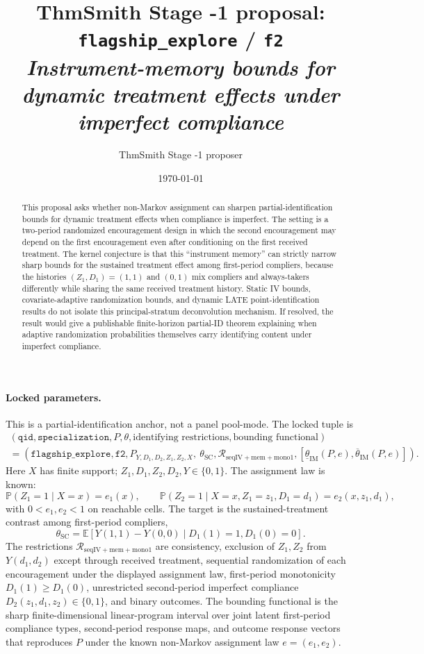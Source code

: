 \documentclass[11pt]{article}
\title{ThmSmith Stage -1 proposal: \texttt{flagship\_explore} / \texttt{f2}%
  \\ \large\textit{Instrument-memory bounds for dynamic treatment effects under imperfect compliance}}
\author{ThmSmith Stage -1 proposer}
\date{\today}
\newcommand{\E}{\mathbb{E}}
\renewcommand{\Pr}{\mathbb{P}}
\theoremstyle{definition}
\theoremstyle{plain}
\theoremstyle{remark}
\begin{document}
\maketitle


\paragraph{Locked parameters.}
This is a partial-identification anchor, not a panel pool-mode.  The locked tuple is
\[
\begin{gathered}
(\texttt{qid},\texttt{specialization},P,\theta,\text{identifying restrictions},
  \text{bounding functional})\\
=
(\texttt{flagship\_explore},\texttt{f2},
  P_{Y,D_1,D_2,Z_1,Z_2,X},\
  \theta_{\mathrm{SC}},
  \mathcal{R}_{\mathrm{seqIV+mem+mono1}},
  [\underline\theta_{\mathrm{IM}}(P,e),\overline\theta_{\mathrm{IM}}(P,e)]) .
\end{gathered}
\]
Here \(X\) has finite support; \(Z_1,D_1,Z_2,D_2,Y\in\{0,1\}\).  The assignment law is known:
\[
\Pr(Z_1=1\mid X=x)=e_1(x),\qquad
\Pr(Z_2=1\mid X=x,Z_1=z_1,D_1=d_1)=e_2(x,z_1,d_1),
\]
with \(0<e_1,e_2<1\) on reachable cells.  The target is the sustained-treatment contrast among first-period compliers,
\[
\theta_{\mathrm{SC}}=\E[Y(1,1)-Y(0,0)\mid D_1(1)=1,D_1(0)=0].
\]
The restrictions \(\mathcal{R}_{\mathrm{seqIV+mem+mono1}}\) are consistency, exclusion of \(Z_1,Z_2\) from \(Y(d_1,d_2)\) except through received treatment, sequential randomization of each encouragement under the displayed assignment law, first-period monotonicity \(D_1(1)\ge D_1(0)\), unrestricted second-period imperfect compliance \(D_2(z_1,d_1,z_2)\in\{0,1\}\), and binary outcomes.  The bounding functional is the sharp finite-dimensional linear-program interval over joint latent first-period compliance types, second-period response maps, and outcome response vectors that reproduces \(P\) under the known non-Markov assignment law \(e=(e_1,e_2)\).

\begin{abstract}
This proposal asks whether non-Markov assignment can sharpen partial-identification bounds for dynamic treatment effects when compliance is imperfect.  The setting is a two-period randomized encouragement design in which the second encouragement may depend on the first encouragement even after conditioning on the first received treatment.  The kernel conjecture is that this ``instrument memory'' can strictly narrow sharp bounds for the sustained treatment effect among first-period compliers, because the histories \((Z_1,D_1)=(1,1)\) and \((0,1)\) mix compliers and always-takers differently while sharing the same received treatment history.  Static IV bounds, covariate-adaptive randomization bounds, and dynamic LATE point-identification results do not isolate this principal-stratum deconvolution mechanism.  If resolved, the result would give a publishable finite-horizon partial-ID theorem explaining when adaptive randomization probabilities themselves carry identifying content under imperfect compliance.
\end{abstract}
\end{document}
